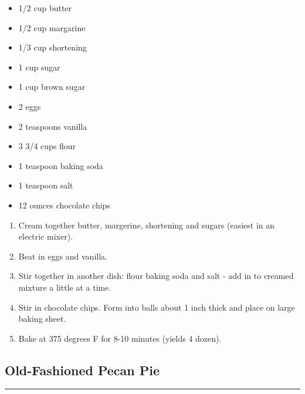 \documentclass{article}
\begin{document}
\begin{framed}
    \begin{itemize}
        \item 1/2 cup butter
        \item 1/2 cup margarine
        \item 1/3 cup shortening
        \item 1 cup sugar
        \item 1 cup brown sugar
        \item 2 eggs
        \item 2 teaspoons vanilla
        \item 3 3/4 cups flour
        \item 1 teaspoon baking soda
        \item 1 teaspoon salt
        \item 12 ounces chocolate chips
    \end{itemize}
\end{framed}

\begin{enumerate}
    \item 
        Cream together butter, margerine, shortening and sugars (easiest in an electric mixer).
    \item 
        Beat in eggs and vanilla.
    \item 
        Stir together in another dish: flour baking soda and salt - add in to creamed mixture a little at a time.
    \item 
        Stir in chocolate chips. Form into balls about 1 inch thick and place on large baking sheet.
    \item 
        Bake at 375 degrees F for 8-10 minutes (yields 4 dozen).
\end{enumerate}
\newpage

\subsection{Old-Fashioned Pecan Pie} 
\noindent\rule[0.5ex]{\linewidth}{1pt}
\end{document}
